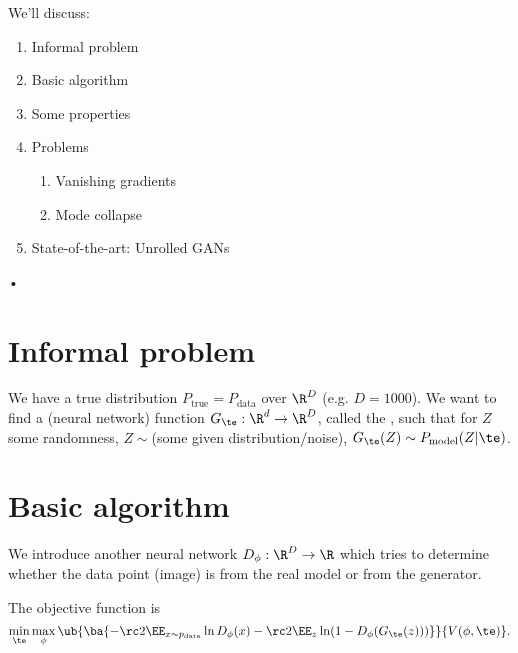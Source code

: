 \def\filepath{C:/Users/oldhe/Dropbox/Math/templates}






\pagestyle{fancy}
\chead{} 
\lfoot{} 
\cfoot{\thepage} 
\rfoot{} 
\renewcommand{\headrulewidth}{.3pt} 
\setlength\voffset{0in}
\setlength\textheight{648pt}




\tableofcontents


We'll discuss:
\begin{enumerate}
\item
Informal problem
\item
Basic algorithm
\item
Some properties
\item
Problems
\begin{enumerate}
\item
Vanishing gradients
\item
Mode collapse
\end{enumerate}
\item
State-of-the-art: Unrolled GANs
\end{enumerate}•

\section{Informal problem}
We have a true distribution $P_{\text{true}} = P_{\text{data}}$ over $\R^{D}$ (e.g. $D=1000$). We want to find a (neural network) function $G_\te:\R^d\to \R^D$, called the , such that for $Z$ some randomness, $Z\sim$(some given distribution/noise), $G_\te(Z) \sim P_{\text{model}}(Z|\te)$.

\section{Basic algorithm}

We introduce another neural network $D_\phi:\R^D\to \R$ which tries to determine whether the data point (image) is from the real model or from the generator.

The objective function is
$$
\min_\te \max_\phi
\ub{\ba{
-\rc 2\EE_{x\sim p_{\text{data}}} \ln D_\phi(x) - \rc 2 \EE_z \ln (1-D_\phi(G_\te(z)))}}{V(\phi,\te)}.
$$

